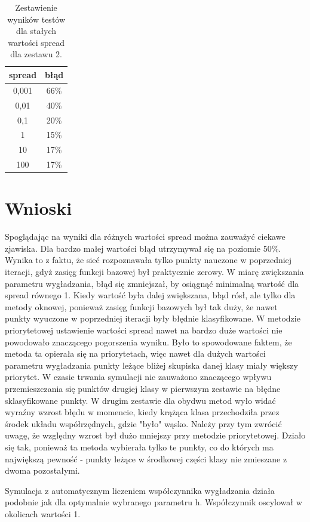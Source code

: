 \documentclass[10pt,a4paper]{article}
\begin{document}
\begin{table}[H]
\centering
\begin{tabular}{|c|c|}
\hline
spread & błąd \\
\hline
0,001 & 66\%  \\
\hline
0,01 & 40\%  \\
\hline
0,1 & 20\%  \\
\hline
1 & 15\%  \\
\hline
10 & 17\%  \\
\hline
100 & 17\%  \\
\hline
\end{tabular}
\caption{Zestawienie wyników testów dla stałych wartości spread dla zestawu 2.}
\label{h_table4}
\end{table}

\section{Wnioski}
Spoglądając na wyniki dla różnych wartości spread można zauważyć ciekawe zjawiska. Dla bardzo małej wartości błąd utrzymywał się na poziomie 50\%. Wynika to z faktu, że sieć rozpoznawała tylko punkty nauczone w poprzedniej iteracji, gdyż zasięg funkcji bazowej był praktycznie zerowy. W miarę zwiększania parametru wygładzania, błąd się zmniejszał, by osiągnąć minimalną wartość dla spread równego 1. Kiedy wartość była dalej zwiększana, błąd rósł, ale tylko dla metody oknowej, ponieważ zasięg funkcji bazowych był tak duży, że nawet punkty wyuczone w poprzedniej iteracji były błędnie klasyfikowane. W metodzie priorytetowej ustawienie wartości spread nawet na bardzo duże wartości nie powodowało znaczącego pogorszenia wyniku. Było to spowodowane faktem, że metoda ta opierała się na priorytetach, więc nawet dla dużych wartości parametru wygładzania punkty leżące bliżej skupiska danej klasy miały większy priorytet. W czasie trwania symulacji nie zauważono znaczącego wpływu przemieszczania się punktów drugiej klasy w pierwszym zestawie na błędne sklasyfikowane punkty. W drugim zestawie dla obydwu metod wyło widać wyraźny wzrost błędu w momencie, kiedy krążąca klasa przechodziła przez środek układu współrzędnych, gdzie "było" wąsko.  Należy przy tym zwrócić uwagę, że względny wzrost był dużo mniejszy przy metodzie priorytetowej. Działo się tak, ponieważ ta metoda wybierała tylko te punkty, co do których ma największą pewność -  punkty leżące w środkowej części klasy nie zmieszane z dwoma pozostałymi.  

Symulacja z automatycznym liczeniem współczynnika wygładzania działa podobnie jak dla optymalnie wybranego parametru h. Współczynnik oscylował w okolicach wartości 1. 
\end{document}
